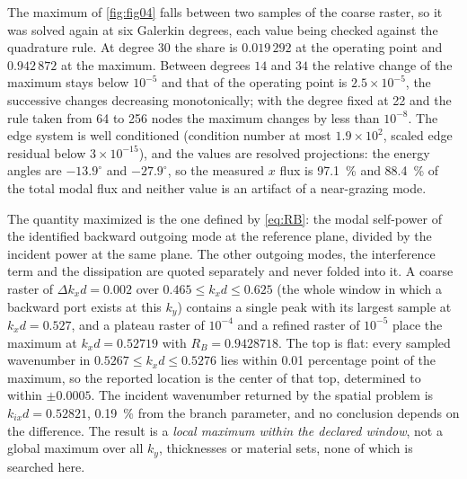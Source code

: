 The maximum of \cref{fig:fig04} falls between two samples of the coarse raster, so it was solved again at six Galerkin degrees, each value being checked against the quadrature rule.  At degree $30$ the share is $0.019\,292$ at the operating point and $0.942\,872$ at the maximum.  Between degrees $14$ and $34$ the relative change of the maximum stays below $10^{-5}$ and that of the operating point is $2.5\times10^{-5}$, the successive changes decreasing monotonically; with the degree fixed at 22 and the rule taken from 64 to 256 nodes the maximum changes by less than $10^{-8}$.  The edge system is well conditioned (condition number at most $1.9\times10^{2}$, scaled edge residual below $3\times10^{-15}$), and the values are resolved projections: the energy angles are $-13.9^{\circ}$ and $-27.9^{\circ}$, so the measured $x$ flux is \SI{97.1}{\percent} and \SI{88.4}{\percent} of the total modal flux and neither value is an artifact of a near-grazing mode.

The quantity maximized is the one defined by \eqref{eq:RB}: the modal self-power of the identified backward outgoing mode at the reference plane, divided by the incident power at the same plane.  The other outgoing modes, the interference term and the dissipation are quoted separately and never folded into it.  A coarse raster of $\Delta k_xd=0.002$ over $0.465\le k_xd\le0.625$ (the whole window in which a backward port exists at this $k_y$) contains a single peak with its largest sample at $k_xd=0.527$, and a plateau raster of $10^{-4}$ and a refined raster of $10^{-5}$ place the maximum at $k_xd=0.52719$ with $R_B=0.9428718$.  The top is flat: every sampled wavenumber in $0.5267\le k_xd\le0.5276$ lies within \SI{0.01}{} percentage point of the maximum, so the reported location is the center of that top, determined to within $\pm0.0005$.  The incident wavenumber returned by the spatial problem is $k_{ix}d=0.52821$, \SI{0.19}{\percent} from the branch parameter, and no conclusion depends on the difference.  The result is a \emph{local maximum within the declared window}, not a global maximum over all $k_y$, thicknesses or material sets, none of which is searched here.

